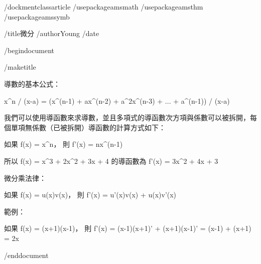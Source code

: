 /dockmentclass{article}
/usepackage{amsmath}
/usepackage{amsthm}
/usepackage{amssymb}

/title{微分}
/author{Young}
/date{}

/begin{document}

/maketitle

導數的基本公式：

x^n / (x-a) = (x^(n-1) + ax^(n-2) + a^2x^(n-3) + ... + a^(n-1)) / (x-a)

我們可以使用導函數來求導數，並且多項式的導函數次方項與係數可以被拆開，每個單項無係數（已被拆開）導函數的計算方式如下：

如果 f(x) = x^n， 則 f'(x) = nx^(n-1)

所以 f(x) = x^3 + 2x^2 + 3x + 4 的導函數為 f'(x) = 3x^2 + 4x + 3

微分乘法律：

如果 f(x) = u(x)v(x)， 則 f'(x) = u'(x)v(x) + u(x)v'(x)

範例：

如果 f(x) = (x+1)(x-1)， 則 f'(x) = (x-1)(x+1)' + (x+1)(x-1)' = (x-1) + (x+1) = 2x

/end{document}
